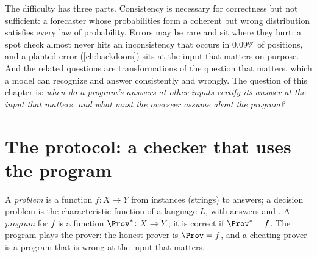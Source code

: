 \begin{refsection}
The difficulty has three parts. Consistency is necessary for correctness but not sufficient: a forecaster whose probabilities form a coherent but wrong distribution satisfies every law of probability. Errors may be rare and sit where they hurt: a spot check almost never hits an inconsistency that occurs in $0.09\%$ of positions, and a planted error (\cref{ch:backdoors}) sits at the input that matters on purpose. And the related questions are transformations of the question that matters, which a model can recognize and answer consistently and wrongly. The question of this chapter is: \emph{when do a program's answers at other inputs certify its answer at the input that matters, and what must the overseer assume about the program?}

\section{The protocol: a checker that uses the program}\label{sec:consistency:protocol}

A \emph{problem} is a function $f\colon X\to Y$ from instances (strings) to answers; a decision problem is the characteristic function of a language $L$, with answers \consistencyyes{} and \consistencyno. A \emph{program} for $f$ is a function $\Prov^*\colon X\to Y$; it is correct if $\Prov^*=f$. The program plays the prover: the honest prover is $\Prov=f$, and a cheating prover is a program that is wrong at the input that matters.



\end{refsection}
